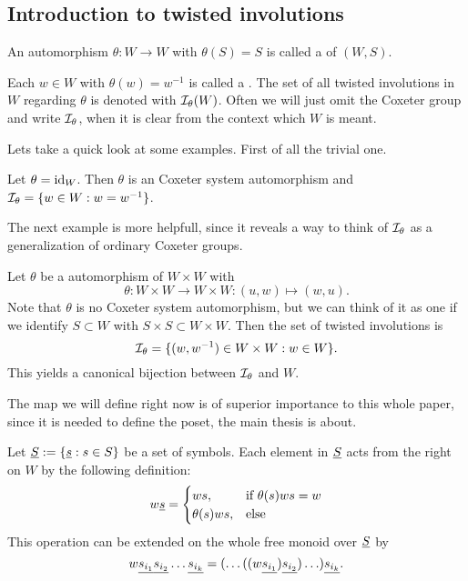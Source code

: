 \subsection{Introduction to twisted involutions}
\label{sec:twisted-involutions-introduction}

\begin{defi}
	An automorphism $\theta : W \to W$ with $\theta(S) = S$ is called a  of $(W,S)$.
\end{defi}

\begin{defi}
	Each $w \in W$ with $\theta(w) = w^{-1}$ is called a . The set of all twisted involutions in $W$ regarding $\theta$ is denoted with $\mathcal{I}_{\theta}(W)$. Often we will just omit the Coxeter group and write $\mathcal{I}_{\theta}$, when it is clear from the context which $W$ is meant.
\end{defi}

Lets take a quick look at some examples. First of all the trivial one.

\begin{exam}
	Let $\theta = \operatorname{id}_W$. Then $\theta$ is an Coxeter system automorphism and $\mathcal{I}_{\theta} = \{ w \in W : w = w^{-1} \}$.
\end{exam}

The next example is more helpfull, since it reveals a way to think of $\mathcal{I}_{\theta}$ as a generalization of ordinary Coxeter groups.

\begin{exam}
	Let $\theta$ be a automorphism of $W \times W$ with
	$$ \theta : W \times W \to W \times W : (u,w) \mapsto (w,u). $$
	Note that $\theta$ is no Coxeter system automorphism, but we can think of it as one if we identify $S \subset W$ with $S \times S \subset W \times W$.
	Then the set of twisted involutions is
	$$ \mathcal{I}_{\theta} = \{ (w,w^{-1}) \in W \times W : w \in W \}. $$
	This yields a canonical bijection between $\mathcal{I}_{\theta}$ and $W$.
\end{exam}

The map we will define right now is of superior importance to this whole paper, since it is needed to define the poset, the main thesis is about.

\begin{defi}
	Let $\underline{S} := \{ \underline{s} : s \in S \}$ be a set of symbols. Each element in $\underline{S}$ acts from the right on $W$ by the following definition:
	$$ w \underline{s} = \begin{cases}
		ws, & \textrm{if } \theta(s)ws = w \\
		\theta(s)ws, & \textrm{else} \\
	\end{cases} $$
	This operation can be extended on the whole free monoid over $\underline{S}$ by
	$$ w \underline{s_{i_1}} \underline{s_{i_2}} \ldots \underline{s_{i_k}} = (\ldots ((w \underline{s_{i_1}}) \underline{s_{i_2}}) \ldots) \underline{s_{i_k}}. $$
\end{defi}